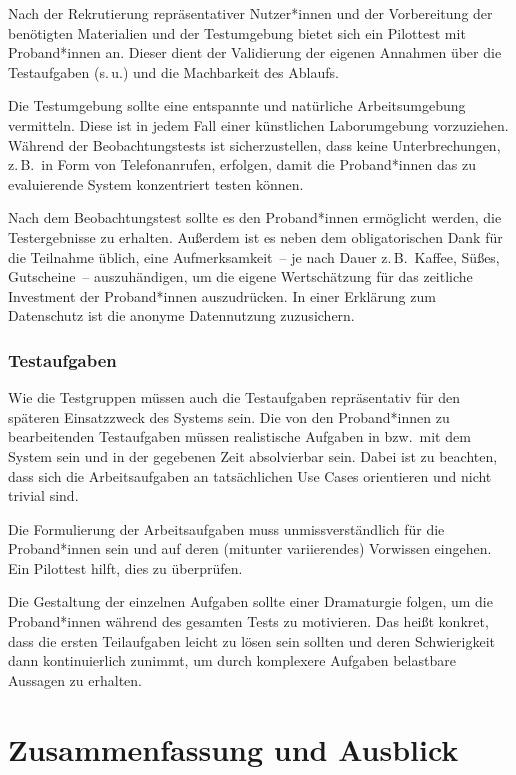 \documentclass[
  11pt,
  letterpaper,
  DIV=11,
  twoside]{scrreprt}
\begin{document}
Nach der Rekrutierung repräsentativer Nutzer*innen und der Vorbereitung
der benötigten Materialien und der Testumgebung bietet sich ein
Pilottest mit Proband*innen an. Dieser dient der Validierung der eigenen
Annahmen über die Testaufgaben (s.\,u.) und die Machbarkeit des Ablaufs.

Die Testumgebung sollte eine entspannte und natürliche Arbeitsumgebung
vermitteln. Diese ist in jedem Fall einer künstlichen Laborumgebung
vorzuziehen. Während der Beobachtungstests ist sicherzustellen, dass
keine Unterbrechungen, z.\,B.~in Form von Telefonanrufen, erfolgen,
damit die Proband*innen das zu evaluierende System konzentriert testen
können.

Nach dem Beobachtungstest sollte es den Proband*innen ermöglicht werden,
die Testergebnisse zu erhalten. Außerdem ist es neben dem
obligatorischen Dank für die Teilnahme üblich, eine Aufmerksamkeit~-- je
nach Dauer z.\,B.~Kaffee, Süßes, Gutscheine~-- auszuhändigen, um die
eigene Wertschätzung für das zeitliche Investment der Proband*innen
auszudrücken. In einer Erklärung zum Datenschutz ist die anonyme
Datennutzung zuzusichern.

\subsubsection{Testaufgaben}\label{testaufgaben}

Wie die Testgruppen müssen auch die Testaufgaben repräsentativ für den
späteren Einsatzzweck des Systems sein. Die von den Proband*innen zu
bearbeitenden Testaufgaben müssen realistische Aufgaben in bzw.~mit dem
System sein und in der gegebenen Zeit absolvierbar sein. Dabei ist zu
beachten, dass sich die Arbeitsaufgaben an tatsächlichen Use Cases
orientieren und nicht trivial sind.

Die Formulierung der Arbeitsaufgaben muss unmissverständlich für die
Proband*innen sein und auf deren (mitunter variierendes) Vorwissen
eingehen. Ein Pilottest hilft, dies zu überprüfen.

Die Gestaltung der einzelnen Aufgaben sollte einer Dramaturgie folgen,
um die Proband*innen während des gesamten Tests zu motivieren. Das heißt
konkret, dass die ersten Teilaufgaben leicht zu lösen sein sollten und
deren Schwierigkeit dann kontinuierlich zunimmt, um durch komplexere
Aufgaben belastbare Aussagen zu erhalten.

\section{Zusammenfassung und
Ausblick}\label{zusammenfassung-und-ausblick-2}
\end{document}
